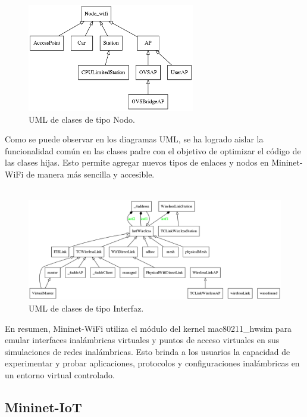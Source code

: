 \begin{figure}[ht]
    \centering
    \includegraphics[width=0.65\textwidth]{archivos/img/teoria/uml_node.png}
    \caption{UML de clases de tipo Nodo.}
    \label{fig:analysis_p4_wifi_4}
\end{figure}



Como se puede observar en los diagramas UML, se ha logrado aislar la funcionalidad común en las clases padre con el objetivo de optimizar el código de las clases hijas. Esto permite agregar nuevos tipos de enlaces y nodos en Mininet-WiFi de manera más sencilla y accesible.\\
\\

\begin{figure}[ht]
    \centering
    \includegraphics[width=\textwidth]{archivos/img/teoria/uml_link.png}
    \caption{UML de clases de tipo Interfaz.}
    \label{fig:analysis_p4_wifi_5}
\end{figure}


En resumen, Mininet-WiFi utiliza el módulo del kernel mac80211\_hwsim para emular interfaces inalámbricas virtuales y puntos de acceso virtuales en sus simulaciones de redes inalámbricas. Esto brinda a los usuarios la capacidad de experimentar y probar aplicaciones, protocolos y configuraciones inalámbricas en un entorno virtual controlado.


\subsection{Mininet-IoT}
\label{mininetIoT}


